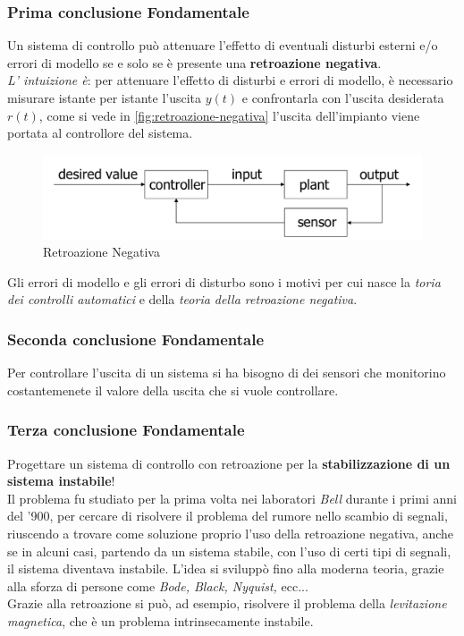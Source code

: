 \documentclass[12pt]{article}
\begin{document}
\subsubsection{Prima conclusione Fondamentale}\label{sec:prima-conclusione-fondamentale}
Un sistema di controllo pu\`o attenuare l'effetto di eventuali disturbi esterni e/o errori di modello se e solo se \`e presente una \textbf{retroazione negativa}. \\
\emph{L' intuizione \`e}: per attenuare l'effetto di disturbi e errori di modello, \`e necessario misurare istante per istante l'uscita $y(t)$ e confrontarla con l'uscita desiderata $r(t)$, come si vede in \autoref{fig:retroazione-negativa} l'uscita dell'impianto viene portata al controllore del sistema.
\begin{figure}[H]
    \centering
    \includegraphics[scale=0.3]{retroazione-negativa.png}
    \caption{Retroazione Negativa}
    \label{fig:retroazione-negativa}
\end{figure}

Gli errori di modello e gli errori di disturbo sono i motivi per cui nasce la \emph{toria dei controlli automatici} e della \emph{teoria della retroazione negativa}.


\subsubsection{Seconda conclusione Fondamentale}\label{sec:seconda-conclusione-fondamentale}
Per controllare l'uscita di un sistema si ha bisogno di dei sensori che monitorino costantemenete il valore della uscita che si vuole controllare.


\subsubsection{Terza conclusione Fondamentale}\label{sec:terza-conclusione-fondamentale}
Progettare un sistema di controllo con retroazione per la \textbf{stabilizzazione di un sistema instabile}! \\
Il problema fu studiato per la prima volta nei laboratori \emph{Bell} durante i primi anni del '900, per cercare di risolvere il problema del rumore nello scambio di segnali, riuscendo a trovare come soluzione proprio l'uso della retroazione negativa, anche se in alcuni casi, partendo da un sistema stabile, con l'uso di certi tipi di segnali, il sistema diventava instabile. L'idea si svilupp\`o fino alla moderna teoria, grazie alla sforza di persone come \emph{Bode, Black, Nyquist,} ecc... \\
Grazie alla retroazione si pu\`o, ad esempio, risolvere il problema della \emph{levitazione magnetica}, che \`e un problema intrinsecamente instabile.
\end{document}
